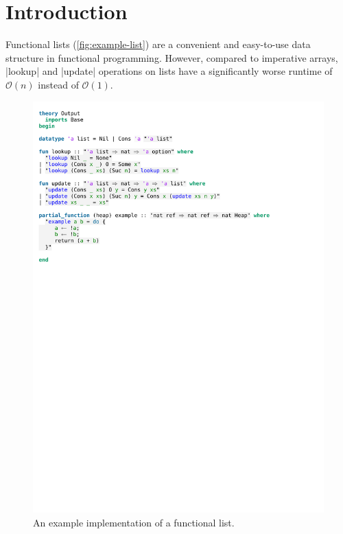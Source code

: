 \chapter{Introduction}\label{chapter:introduction}

Functional lists (\autoref{fig:example-list}) are a convenient and easy-to-use data structure in functional programming. However, compared to imperative arrays, |lookup| and |update| operations on lists have a significantly worse runtime of $\mathcal{O}(n)$ instead of $\mathcal{O}(1)$. 

\begin{figure}[htpb]
\includegraphics[trim={0 22,2cm 0 2,3cm},clip, width=1.00\textwidth]{figures/Theory_Intro.pdf}
\caption[Example functional list implementation]{An example implementation of a functional list.}\label{fig:example-list}
\end{figure}

